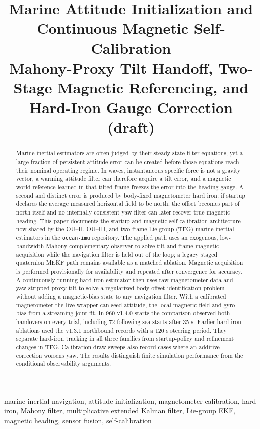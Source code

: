 \documentclass[conference]{IEEEtran}
\title{Marine Attitude Initialization and Continuous Magnetic Self-Calibration\\
\large Mahony-Proxy Tilt Handoff, Two-Stage Magnetic Referencing, and Hard-Iron Gauge Correction (draft)}
\author{%
\IEEEauthorblockN{Mikhail S. Grushinskiy}
\IEEEauthorblockA{Independent Researcher, USA, Fair Lawn\\
Bareboat Necessities GitHub Project\\
Email: mgrouch@users.github.com}%
}
\begin{document}
\maketitle

\begin{abstract}
Marine inertial estimators are often judged by their steady-state filter equations,
yet a large fraction of persistent attitude error can be created before those
equations reach their nominal operating regime.  In waves, instantaneous specific
force is not a gravity vector, a warming attitude filter can therefore acquire a
tilt error, and a magnetic world reference learned in that tilted frame freezes the
error into the heading gauge.  A second and distinct error is produced by body-fixed
magnetometer hard iron: if startup declares the average measured horizontal field to
be north, the offset becomes part of north itself and no internally consistent yaw
filter can later recover true magnetic heading.  This paper documents the startup
and magnetic self-calibration architecture now shared by the OU--II, OU--III, and
two-frame Lie-group (TFG) marine inertial estimators in the \texttt{ocean-imu}
repository.  The applied path uses an exogenous, low-bandwidth Mahony complementary
observer to solve tilt and frame magnetic acquisition while the navigation filter is
held out of the loop; a legacy staged quaternion MEKF path remains available as a
matched ablation.  Magnetic acquisition is performed provisionally for availability
and repeated after convergence for accuracy.  A continuously running hard-iron
estimator then uses raw magnetometer data and yaw-stripped proxy tilt to solve a
regularized body-offset identification problem without adding a magnetic-bias state
to any navigation filter. With a calibrated magnetometer the live wrapper
can seed attitude, the local magnetic field and gyro bias from a streaming
joint fit. In 960 v1.4.0 starts the comparison observed both handovers on
every trial, including 72 following-sea starts after 35 s. Earlier hard-iron
ablations used the v1.3.1 northbound records with a 120 s steering period.
They separate hard-iron tracking in all three families from startup-policy
and refinement changes in TFG. Calibration-draw sweeps also record cases
where an additive correction worsens yaw. The results distinguish finite
simulation performance from the conditional observability arguments.
\end{abstract}

\begin{IEEEkeywords}
marine inertial navigation, attitude initialization, magnetometer calibration,
hard iron, Mahony filter, multiplicative extended Kalman filter, Lie-group EKF,
magnetic heading, sensor fusion, self-calibration
\end{IEEEkeywords}
\end{document}
